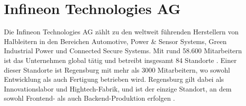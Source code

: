 \section{Infineon Technologies AG}

Die Infineon Technologies AG zählt zu den weltweit führenden Herstellern von Halbleitern in den Bereichen Automotive, Power \& Sensor Systems, Green Industrial Power und Connected Secure Systems. Mit rund 58.600 Mitarbeitern ist das Unternehmen global tätig und betreibt insgesamt 84 Standorte \cite{infineon2024unternehmenspraesentation}. Einer dieser Standorte ist Regensburg mit mehr als 3000 Mitarbeitern, wo sowohl Entwicklung als auch Fertigung betrieben wird. Regensburg gilt dabei als Innovationslabor und Hightech-Fabrik, und ist der einzige Standort, an dem sowohl Frontend- als auch Backend-Produktion erfolgen \cite{infineon2024regensburg}.
